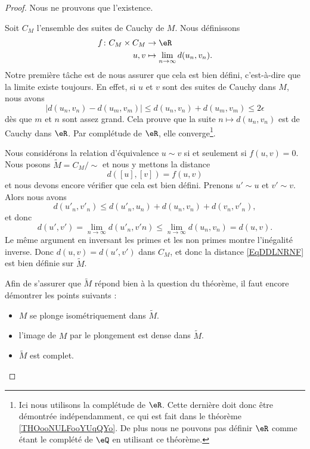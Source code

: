 \begin{proof}
	Nous ne prouvons que l'existence.

	Soit \( C_M\) l'ensemble des suites de Cauchy de \( M\). Nous définissons
	\begin{equation}
		\begin{aligned}
			f\colon C_M\times C_M & \to \eR                                \\
			u,v                   & \mapsto \lim_{n\to \infty} d(u_n,v_n).
		\end{aligned}
	\end{equation}
	Notre première tâche est de nous assurer que cela est bien défini, c'est-à-dire que la limite existe toujours. En effet, si \( u\) et \( v\) sont des suites de Cauchy dans \( M\), nous avons
	\begin{equation}
		\left| d(u_n,v_n)-d(u_m,v_m) \right| \leq d(u_n,v_n)+d(u_m,v_m)\leq 2\epsilon
	\end{equation}
	dès que \( m\) et \( n\) sont assez grand. Cela prouve que la suite \( n\mapsto d(u_n,v_n)\) est de Cauchy dans \( \eR\). Par complétude de \( \eR\), elle converge\footnote{Ici nous utilisons la complétude de \( \eR\). Cette dernière doit donc être démontrée indépendamment, ce qui est fait dans le théorème \ref{THOooNULFooYUqQYo}. De plus nous ne pouvons pas définir \( \eR\) comme étant le complété de \( \eQ\) en utilisant ce théorème.}.

	Nous considérons la relation d'équivalence \( u\sim v\) si et seulement si \( f(u,v)=0\). Nous posons \( \tilde M=C_M/\sim\) et nous y mettons la distance
	\begin{equation}    \label{EqDDLNRNF}
		d( [u],[v]  )=f(u,v)
	\end{equation}
	et nous devons encore vérifier que cela est bien défini. Prenons \( u'\sim u\) et \( v'\sim v\). Alors nous avons
	\begin{equation}
		d(u'_n,v'_n)\leq d(u'_n,u_n)+d(u_n,v_n)+d(v_n,v'_n),
	\end{equation}
	et donc
	\begin{equation}
		d(u',v')=\lim_{n\to \infty} d(u'_n,v'n)\leq \lim_{n\to \infty} d(u_n,v_n)=d(u,v).
	\end{equation}
	Le même argument en inversant les primes et les non primes montre l'inégalité inverse. Donc \( d(u,v)=d(u',v')\) dans \( C_M\), et donc la distance \eqref{EqDDLNRNF} est bien définie sur \( \tilde M\).

	Afin de s'assurer que \( \tilde M\) répond bien à la question du théorème, il faut encore démontrer les points suivants :
	\begin{itemize}
		\item \( M\) se plonge isométriquement dans \( \tilde M\).
		\item l'image de \( M\) par le plongement est dense dans \( \tilde M\).
		\item \( \tilde M\) est complet.
	\end{itemize}


\end{proof}
